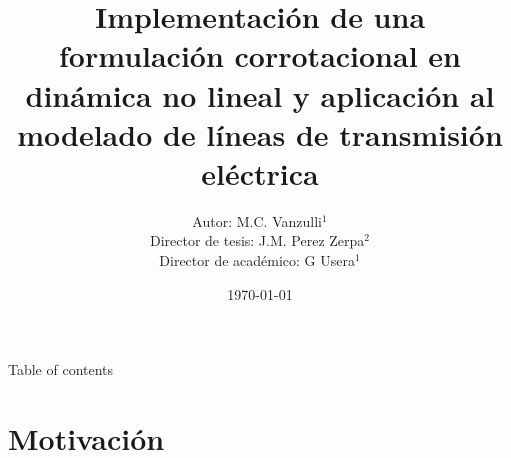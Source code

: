 \documentclass{beamer}
\begin{document}
\title[Implementación de una formulación corrotacional en dinámica no lineal y aplicación a líneas de trasmisión]{Implementación de una formulación corrotacional en dinámica no lineal y aplicación al modelado de líneas de transmisión eléctrica }
\author[M.C.\,Vanzulli]{Autor: M.C. Vanzulli$^1$ \\Director de tesis: J.M. Perez Zerpa$^2$ \\ Director de académico: G Usera$^1$ }


\date{\today}
\subject{Presentation Subject}


\begin{frame}[plain]
\maketitle
\end{frame}

\begin{frame}{Table of contents}
\tableofcontents
\end{frame}
\section[Motivación]{Motivación}
\end{document}
